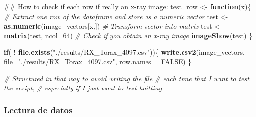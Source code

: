 \documentclass[]{article}
\newenvironment{Shaded}{\begin{snugshade}}{\end{snugshade}}
\newcommand{\KeywordTok}[1]{\textcolor[rgb]{0.13,0.29,0.53}{\textbf{#1}}}
\newcommand{\DataTypeTok}[1]{\textcolor[rgb]{0.13,0.29,0.53}{#1}}
\newcommand{\DecValTok}[1]{\textcolor[rgb]{0.00,0.00,0.81}{#1}}
\newcommand{\StringTok}[1]{\textcolor[rgb]{0.31,0.60,0.02}{#1}}
\newcommand{\CommentTok}[1]{\textcolor[rgb]{0.56,0.35,0.01}{\textit{#1}}}
\newcommand{\OtherTok}[1]{\textcolor[rgb]{0.56,0.35,0.01}{#1}}
\newcommand{\ControlFlowTok}[1]{\textcolor[rgb]{0.13,0.29,0.53}{\textbf{#1}}}
\newcommand{\OperatorTok}[1]{\textcolor[rgb]{0.81,0.36,0.00}{\textbf{#1}}}
\newcommand{\NormalTok}[1]{#1}
\begin{document}
\begin{Shaded}
\begin{Highlighting}[]
\NormalTok{## How to check if each row if really an x-ray image:}
\NormalTok{test_row <-}\StringTok{ }\ControlFlowTok{function}\NormalTok{(x)\{}
\CommentTok{# Extract one row of the dataframe and store as a numeric vector}
\NormalTok{ test <-}\StringTok{ }\KeywordTok{as.numeric}\NormalTok{(image_vectors[x,])}
\CommentTok{# Transform vector into matrix}
\NormalTok{ test <-}\StringTok{ }\KeywordTok{matrix}\NormalTok{(test, }\DataTypeTok{ncol=}\DecValTok{64}\NormalTok{)}
\CommentTok{# Check if you obtain an x-ray image}
 \KeywordTok{imageShow}\NormalTok{(test)}
\NormalTok{\}}
\end{Highlighting}
\end{Shaded}

\begin{Shaded}
\end{Shaded}

\begin{Shaded}
\begin{Highlighting}[]
\ControlFlowTok{if}\NormalTok{( }\OperatorTok{!}\StringTok{ }\KeywordTok{file.exists}\NormalTok{(}\StringTok{"./results/RX_Torax_4097.csv"}\NormalTok{))\{}
  \KeywordTok{write.csv2}\NormalTok{(image_vectors,}
           \DataTypeTok{file=}\StringTok{"./results/RX_Torax_4097.csv"}\NormalTok{,}
           \DataTypeTok{row.names =} \OtherTok{FALSE}\NormalTok{)}
\NormalTok{\}}

\CommentTok{# Structured in that way to avoid writing the file}
\CommentTok{# each time that I want to test the script,}
\CommentTok{# especially if I just want to test knitting}
\end{Highlighting}
\end{Shaded}

\subsubsection{Lectura de datos}\label{lectura-de-datos}
\end{document}
